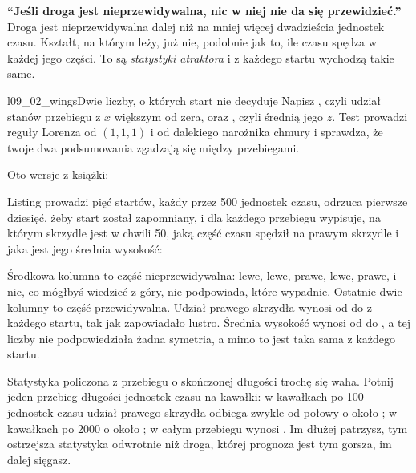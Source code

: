 \begin{trapbox}
\textbf{\enquote{Jeśli droga jest nieprzewidywalna, nic w niej nie da się
przewidzieć.}} Droga jest nieprzewidywalna dalej niż na mniej więcej
dwadzieścia jednostek czasu. Kształt, na którym leży, już nie, podobnie
jak to, ile czasu spędza w każdej jego części. To są \emph{statystyki
atraktora} i z każdego startu wychodzą takie same.
\end{trapbox}

\begin{lab}{l09_02_wings}{Dwie liczby, o których start nie decyduje}
Napisz , czyli udział stanów przebiegu z $x$ większym od
zera, oraz , czyli średnią jego $z$. Test prowadzi reguły
Lorenza od $(1, 1, 1)$ i od dalekiego narożnika chmury i sprawdza, że twoje
dwa podsumowania zgadzają się między przebiegami.
\end{lab}

\noindent
Oto wersje z książki:


\noindent
Listing prowadzi pięć startów, każdy przez 500 jednostek czasu, odrzuca
pierwsze dziesięć, żeby start został zapomniany, i dla każdego przebiegu
wypisuje, na którym skrzydle jest w chwili 50, jaką część czasu spędził na
prawym skrzydle i jaka jest jego średnia wysokość:


\noindent
Środkowa kolumna to część nieprzewidywalna: lewe, lewe, prawe, lewe, prawe, i
nic, co mógłbyś wiedzieć z góry, nie podpowiada, które wypadnie. Ostatnie dwie kolumny to
część przewidywalna. Udział prawego skrzydła wynosi od  do
 z każdego startu, tak jak zapowiadało lustro. Średnia
wysokość wynosi od  do , a tej liczby
nie podpowiedziała żadna symetria, a mimo to jest taka sama z każdego startu.

Statystyka policzona z przebiegu o skończonej długości trochę się waha. Potnij jeden przebieg
długości  jednostek czasu na kawałki: w kawałkach po 100
jednostek czasu udział prawego skrzydła odbiega zwykle od połowy o około
; w kawałkach po 2000 \dash{} o około
; w całym przebiegu wynosi . Im
dłużej patrzysz, tym ostrzejsza statystyka \dash{} odwrotnie niż droga,
której prognoza jest tym gorsza, im dalej sięgasz.

